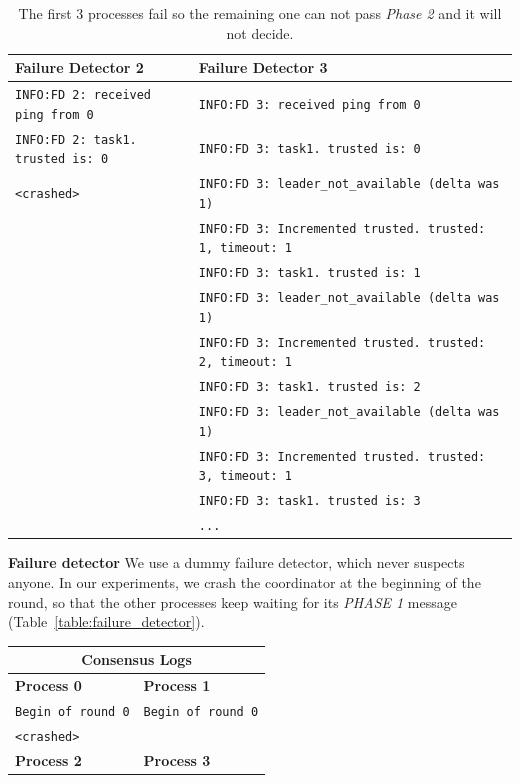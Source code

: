 \documentclass[a4paper]{article}
\begin{document}
\begin{compactitem}
\begin{table}[H]
\begin{tabular}{ll}
        \midrule
		\textbf{Failure Detector 2} & \textbf{Failure Detector 3} \\
		\midrule
        \verb|INFO:FD 2: received ping from 0| & \verb|INFO:FD 3: received ping from 0| \\
		\verb|INFO:FD 2: task1. trusted is: 0| & \verb|INFO:FD 3: task1. trusted is: 0| \\
		\verb|<crashed>| & \verb|INFO:FD 3: leader_not_available (delta was 1)| \\
		& \verb|INFO:FD 3: Incremented trusted. trusted: 1, timeout: 1| \\
		& \verb|INFO:FD 3: task1. trusted is: 1| \\
		& \verb|INFO:FD 3: leader_not_available (delta was 1)| \\
		& \verb|INFO:FD 3: Incremented trusted. trusted: 2, timeout: 1| \\
		& \verb|INFO:FD 3: task1. trusted is: 2| \\
		& \verb|INFO:FD 3: leader_not_available (delta was 1)| \\
		& \verb|INFO:FD 3: Incremented trusted. trusted: 3, timeout: 1| \\
		& \verb|INFO:FD 3: task1. trusted is: 3| \\
		& \verb|...| \\
        \bottomrule
        \end{tabular}
        \caption{\small{The first $3$ processes fail so the remaining one can not pass \emph{Phase 2} and it will not decide.}}
        \label{table:max_failures}
	\end{table}
  \item \textbf{Failure detector} We use a dummy failure detector, which never suspects anyone. In our experiments, we crash the coordinator at the beginning of the round, so that the other processes keep waiting for its \emph{PHASE 1} message (Table~\ref{table:failure_detector}).
  	\begin{table}[H]
		\centering\scriptsize
        \begin{tabular}{ll}
		\toprule
        \multicolumn{2}{c}{\textbf{Consensus Logs}} \\
        \midrule
		\textbf{Process 0} & \textbf{Process 1} \\
		\midrule
        \verb|Begin of round 0| & \verb|Begin of round 0| \\
		\verb|<crashed>| & \\
        \midrule
		\textbf{Process 2} & \textbf{Process 3} \\

\end{tabular}
\end{table}
\end{compactitem}
\end{document}
